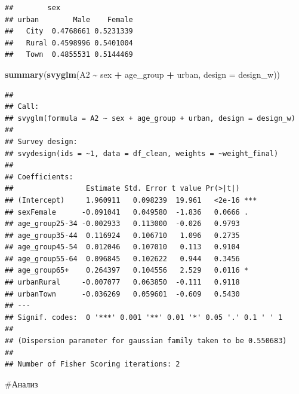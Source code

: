 \documentclass[
]{article}
\newenvironment{Shaded}{\begin{snugshade}}{\end{snugshade}}
\newcommand{\AttributeTok}[1]{\textcolor[rgb]{0.13,0.29,0.53}{#1}}
\newcommand{\FunctionTok}[1]{\textcolor[rgb]{0.13,0.29,0.53}{\textbf{#1}}}
\newcommand{\NormalTok}[1]{#1}
\newcommand{\SpecialCharTok}[1]{\textcolor[rgb]{0.81,0.36,0.00}{\textbf{#1}}}
\begin{document}
\begin{verbatim}
##        sex
## urban        Male    Female
##   City  0.4768661 0.5231339
##   Rural 0.4598996 0.5401004
##   Town  0.4855531 0.5144469
\end{verbatim}

\begin{Shaded}
\begin{Highlighting}[]
\FunctionTok{summary}\NormalTok{(}\FunctionTok{svyglm}\NormalTok{(A2 }\SpecialCharTok{\textasciitilde{}}\NormalTok{ sex }\SpecialCharTok{+}\NormalTok{ age\_group }\SpecialCharTok{+}\NormalTok{ urban, }\AttributeTok{design =}\NormalTok{ design\_w))}
\end{Highlighting}
\end{Shaded}

\begin{verbatim}
## 
## Call:
## svyglm(formula = A2 ~ sex + age_group + urban, design = design_w)
## 
## Survey design:
## svydesign(ids = ~1, data = df_clean, weights = ~weight_final)
## 
## Coefficients:
##                 Estimate Std. Error t value Pr(>|t|)    
## (Intercept)     1.960911   0.098239  19.961   <2e-16 ***
## sexFemale      -0.091041   0.049580  -1.836   0.0666 .  
## age_group25-34 -0.002933   0.113000  -0.026   0.9793    
## age_group35-44  0.116924   0.106710   1.096   0.2735    
## age_group45-54  0.012046   0.107010   0.113   0.9104    
## age_group55-64  0.096845   0.102622   0.944   0.3456    
## age_group65+    0.264397   0.104556   2.529   0.0116 *  
## urbanRural     -0.007077   0.063850  -0.111   0.9118    
## urbanTown      -0.036269   0.059601  -0.609   0.5430    
## ---
## Signif. codes:  0 '***' 0.001 '**' 0.01 '*' 0.05 '.' 0.1 ' ' 1
## 
## (Dispersion parameter for gaussian family taken to be 0.550683)
## 
## Number of Fisher Scoring iterations: 2
\end{verbatim}

\#Анализ
\end{document}
